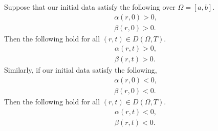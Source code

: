 \documentclass[10pt,a4paper]{amsart}
\begin{document}
\begin{thm}
	Suppose that our initial data satisfy the following over $\Omega=[a,b]$. 
	\begin{align}
		&\alpha(r,0) > 0, 
		\\
		&\beta(r,0) > 0.
	\end{align} 
	Then the following hold for all $(r,t) \in D(\Omega,T)$. 
	\begin{align}
		&\alpha(r,t) > 0, 
		\\
		&\beta(r,t) > 0. 
	\end{align} 
	Similarly, if our initial data satisfy the following, 
	\begin{align}
		&\alpha(r,0) < 0 ,
		\\
		&\beta(r,0) < 0.
	\end{align} 
	Then the following hold for all $(r,t) \in D(\Omega,T)$. 
	\begin{align}
		&\alpha(r,t) < 0, 
		\\
		&\beta(r,t) < 0. 
	\end{align} 
\end{thm} 
\end{document}

